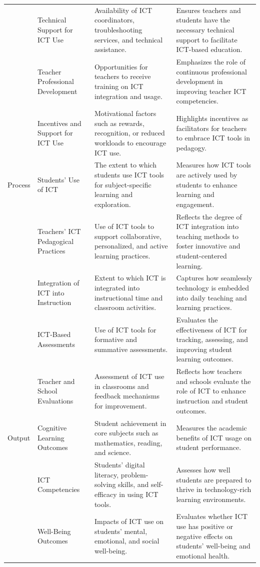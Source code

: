 \documentclass[
]{article}
\begin{document}
\begin{longtable}[l]{>{\raggedright\arraybackslash}p{1.5cm}>{\raggedright\arraybackslash}p{3.5cm}>{\raggedright\arraybackslash}p{5cm}>{\raggedright\arraybackslash}p{5cm}}
 & Technical Support for ICT Use & Availability of ICT coordinators, troubleshooting services, and technical assistance. & Ensures teachers and students have the necessary technical support to facilitate ICT-based education.\\
 & Teacher Professional Development & Opportunities for teachers to receive training on ICT integration and usage. & Emphasizes the role of continuous professional development in improving teacher ICT competencies.\\
\addlinespace
 & Incentives and Support for ICT Use & Motivational factors such as rewards, recognition, or reduced workloads to encourage ICT use. & Highlights incentives as facilitators for teachers to embrace ICT tools in pedagogy.\\
Process & Students’ Use of ICT & The extent to which students use ICT tools for subject-specific learning and exploration. & Measures how ICT tools are actively used by students to enhance learning and engagement.\\
 & Teachers’ ICT Pedagogical Practices & Use of ICT tools to support collaborative, personalized, and active learning practices. & Reflects the degree of ICT integration into teaching methods to foster innovative and student-centered learning.\\
 & Integration of ICT into Instruction & Extent to which ICT is integrated into instructional time and classroom activities. & Captures how seamlessly technology is embedded into daily teaching and learning practices.\\
 & ICT-Based Assessments & Use of ICT tools for formative and summative assessments. & Evaluates the effectiveness of ICT for tracking, assessing, and improving student learning outcomes.\\
\addlinespace
 & Teacher and School Evaluations & Assessment of ICT use in classrooms and feedback mechanisms for improvement. & Reflects how teachers and schools evaluate the role of ICT to enhance instruction and student outcomes.\\
Output & Cognitive Learning Outcomes & Student achievement in core subjects such as mathematics, reading, and science. & Measures the academic benefits of ICT usage on student performance.\\
 & ICT Competencies & Students' digital literacy, problem-solving skills, and self-efficacy in using ICT tools. & Assesses how well students are prepared to thrive in technology-rich learning environments.\\
 & Well-Being Outcomes & Impacts of ICT use on students’ mental, emotional, and social well-being. & Evaluates whether ICT use has positive or negative effects on students' well-being and emotional health.\\
\bottomrule
\end{longtable}
\end{document}
